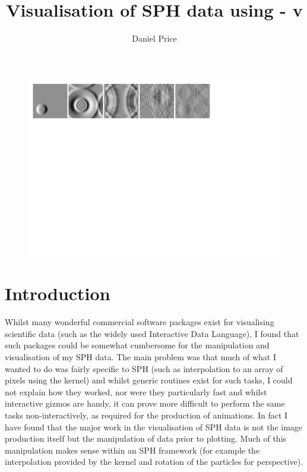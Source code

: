 \documentclass[a4paper,10pt]{article}
\title{Visualisation of SPH data using \splash - v}
\author{Daniel Price}
\begin{document}

\begin{figure}
\begin{center}
\includegraphics[width=\textwidth]{hyperbolic.pdf}
\end{center}
\end{figure}
\maketitle
\tableofcontents%
\newpage

\section{Introduction}%
 Whilst many wonderful commercial software packages exist for visualising scientific
data (such as the widely used Interactive Data Language), I found that such packages
could be somewhat cumbersome for the manipulation and visualisation of my SPH data. The
main problem was that much of what I wanted to do was fairly specific to SPH (such as
interpolation to an array of pixels using the kernel) and whilst generic routines exist
for such tasks, I could not explain how they worked, nor were they
particularly fast and whilst interactive gizmos are handy, it can prove more difficult to perform the
same tasks non-interactively, as required for the production of animations. 
In fact I have found that the major work in the visualisation of SPH data is not the image production itself but the
manipulation of data prior to plotting. Much of this manipulation makes sense
within an SPH framework (for example the interpolation provided by the kernel
and rotation of the particles for perspective).
\end{document}
